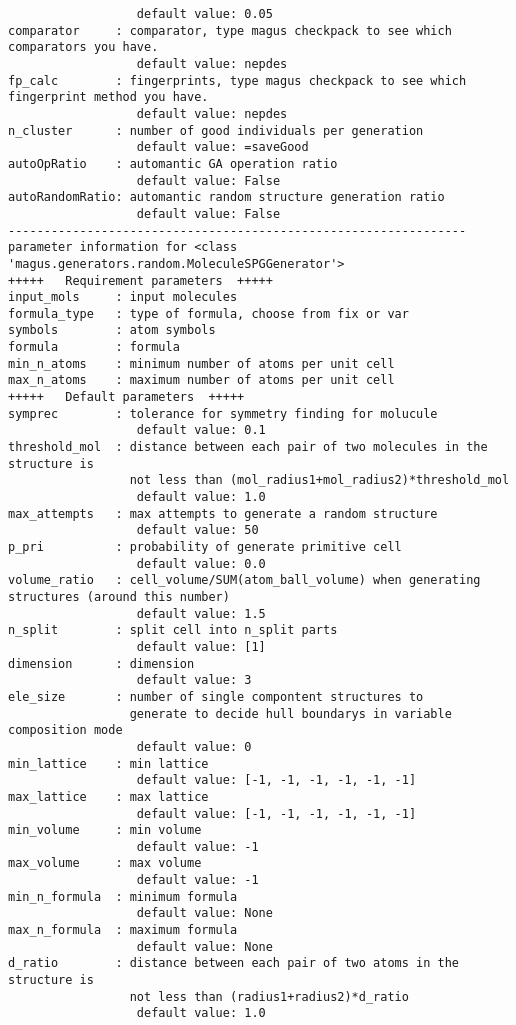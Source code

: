 \documentclass[12pt,oneside]{book}
\begin{document}
\begin{tcolorbox}
\begin{verbatim}
                  default value: 0.05
comparator     : comparator, type magus checkpack to see which comparators you have.
                  default value: nepdes
fp_calc        : fingerprints, type magus checkpack to see which fingerprint method you have.
                  default value: nepdes
n_cluster      : number of good individuals per generation
                  default value: =saveGood
autoOpRatio    : automantic GA operation ratio
                  default value: False
autoRandomRatio: automantic random structure generation ratio
                  default value: False
----------------------------------------------------------------
parameter information for <class 'magus.generators.random.MoleculeSPGGenerator'>
+++++	Requirement parameters	+++++
input_mols     : input molecules
formula_type   : type of formula, choose from fix or var
symbols        : atom symbols
formula        : formula
min_n_atoms    : minimum number of atoms per unit cell
max_n_atoms    : maximum number of atoms per unit cell
+++++	Default parameters	+++++
symprec        : tolerance for symmetry finding for molucule
                  default value: 0.1
threshold_mol  : distance between each pair of two molecules in the structure is 
                 not less than (mol_radius1+mol_radius2)*threshold_mol
                  default value: 1.0
max_attempts   : max attempts to generate a random structure
                  default value: 50
p_pri          : probability of generate primitive cell
                  default value: 0.0
volume_ratio   : cell_volume/SUM(atom_ball_volume) when generating structures (around this number)
                  default value: 1.5
n_split        : split cell into n_split parts
                  default value: [1]
dimension      : dimension
                  default value: 3
ele_size       : number of single compontent structures to
                 generate to decide hull boundarys in variable composition mode
                  default value: 0
min_lattice    : min lattice
                  default value: [-1, -1, -1, -1, -1, -1]
max_lattice    : max lattice
                  default value: [-1, -1, -1, -1, -1, -1]
min_volume     : min volume
                  default value: -1
max_volume     : max volume
                  default value: -1
min_n_formula  : minimum formula
                  default value: None
max_n_formula  : maximum formula
                  default value: None
d_ratio        : distance between each pair of two atoms in the structure is
                 not less than (radius1+radius2)*d_ratio
                  default value: 1.0

\end{verbatim}
\end{tcolorbox}
\end{document}
